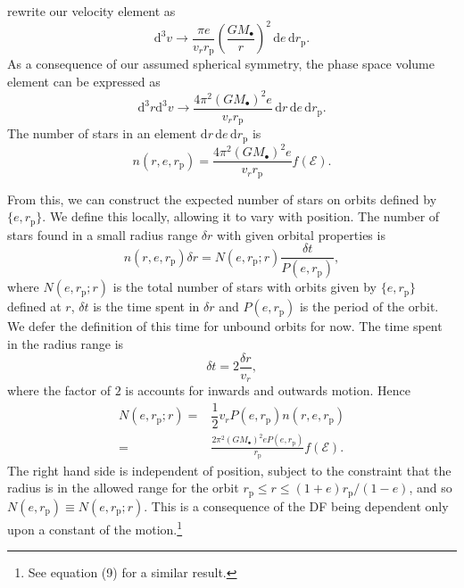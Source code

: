 \documentclass[useAMS,usedcolumn,usegraphicx,usenatbib]{mn2e}
\newcommand{\sub}[1]{\ensuremath{_\mathrm{#1}}}
\newcommand{\dd}{\ensuremath{\mathrm{d}}}
\newcommand{\recip}[1]{\ensuremath{\dfrac{1}{#1}}}
\begin{document}
rewrite our velocity element as
\begin{equation}
\dd^3v \rightarrow \frac{\pi e}{v_rr\sub{p}}\left(\frac{GM_\bullet}{r}\right)^2\,\dd e \,\dd r\sub{p}.
\end{equation}
As a consequence of our assumed spherical symmetry, 
the phase space volume element can be expressed as
\begin{equation}
\dd^3r\dd^3v \rightarrow \frac{4\pi^2(GM_\bullet)^2e}{v_rr\sub{p}}\,\dd r\,\dd e \,\dd r\sub{p}.
\end{equation}
The number of stars in an element $\dd r\,\dd e\,\dd r\sub{p}$ is
\begin{equation}
n(r, e, r\sub{p}) = \frac{4\pi^2(GM_\bullet)^2e}{v_rr\sub{p}}f(\mathcal{E}).
\end{equation}

From this, we can construct the expected number of stars on orbits defined by $\{e, r\sub{p}\}$. We define this locally, allowing it to vary with position. The number of stars found in a small radius range $\delta r$ with given orbital properties is
\begin{equation}
n(r, e, r\sub{p})\delta r = N(e, r\sub{p}; r)\frac{\delta t}{P(e, r\sub{p})},
\end{equation}
where $N(e, r\sub{p}; r)$ is the total number of stars with orbits given by $\{e, r\sub{p}\}$ defined at $r$, $\delta t$ is the time spent in $\delta r$ and $P(e, r\sub{p})$ is the period of the orbit. We defer the definition of this time for unbound orbits for now. The time spent in the radius range is
\begin{equation}
\delta t = 2\frac{\delta r}{v_r},
\end{equation}
where the factor of $2$ is accounts for inwards and outwards motion. Hence
\begin{align}
N(e, r\sub{p}; r) = {} & \recip{2} v_r P(e, r\sub{p}) n(r, e, r\sub{p}) \nonumber \\
 = {} & \frac{2\pi^2(GM_\bullet)^2 e P(e, r\sub{p})}{r\sub{p}}f(\mathcal{E}).
\end{align}
The right hand side is independent of position, subject to the constraint that the radius is in the allowed range for the orbit $r\sub{p} \leq r \leq (1+e)r\sub{p}/(1-e)$, and so $N(e, r\sub{p}) \equiv N(e, r\sub{p}; r)$. This is a consequence of the DF being dependent only upon a constant of the motion.\footnote{See \citet{Bahcall1976} equation (9) for a similar result.}
\end{document}
